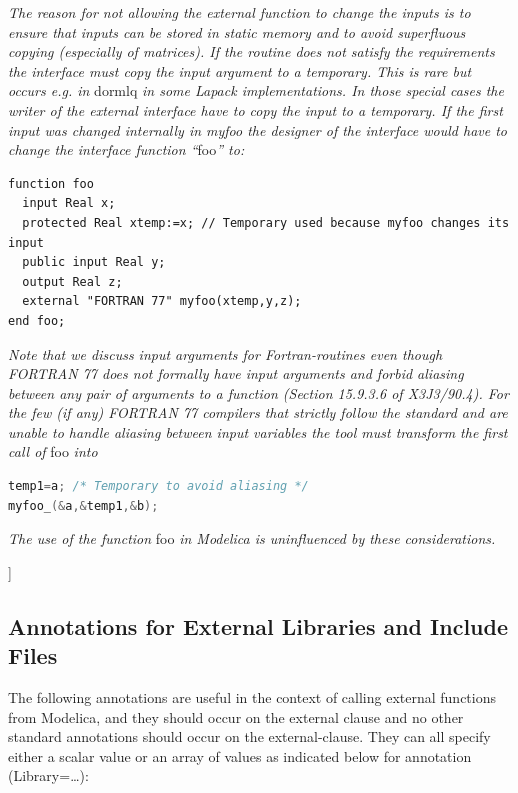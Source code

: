 \documentclass[10pt,a4paper]{report}
\def\doublelabel#1{\label{#1}\hypertarget{#1}{}}
\begin{document}
\emph{The reason for not allowing the external function to change the
inputs is to ensure that inputs can be stored in static memory and to
avoid superfluous copying (especially of matrices). If the routine does
not satisfy the requirements the interface must copy the input argument
to a temporary. This is rare but occurs e.g. in} dormlq \emph{in some
Lapack implementations. In those special cases the writer of the
external interface have to copy the input to a temporary. If the first
input was changed internally in myfoo the designer of the interface
would have to change the interface function ``}foo\emph{'' to:}

\begin{lstlisting}[language=modelica]
function foo
  input Real x;
  protected Real xtemp:=x; // Temporary used because myfoo changes its input
  public input Real y;
  output Real z;
  external "FORTRAN 77" myfoo(xtemp,y,z);
end foo;
\end{lstlisting}

\emph{Note that we discuss input arguments for Fortran-routines even
though FORTRAN 77 does not formally have input arguments and forbid
aliasing between any pair of arguments to a function (Section 15.9.3.6
of X3J3/90.4). For the few (if any) FORTRAN 77 compilers that strictly
follow the standard and are unable to handle aliasing between input
variables the tool must transform the first call of} foo \emph{into}
\begin{lstlisting}[language=C]
temp1=a; /* Temporary to avoid aliasing */
myfoo_(&a,&temp1,&b);
\end{lstlisting}

\emph{The use of the function} foo \emph{in Modelica is uninfluenced by
these considerations.}

{]}

\subsection{Annotations for External Libraries and Include Files}\doublelabel{annotations-for-external-libraries-and-include-files}

The following annotations are useful in the context of calling external
functions from Modelica, and they should occur on the external clause
and no other standard annotations should occur on the external-clause.
They can all specify either a scalar value or an array of values as
indicated below for annotation (Library=\ldots{}):
\end{document}
